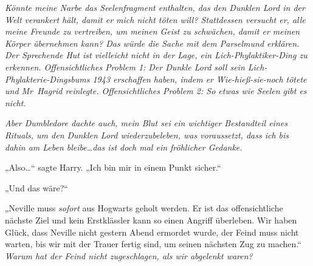 \emph{Könnte meine \emph{Narbe} das Seelenfragment enthalten, das den Dunklen Lord in der Welt verankert hält, damit er mich nicht töten will? Stattdessen versucht er, alle meine Freunde zu vertreiben, um meinen Geist zu schwächen, damit er meinen Körper übernehmen kann? Das würde die Sache mit dem Parselmund erklären. Der Sprechende Hut ist vielleicht nicht in der Lage, ein Lich-Phylaktiker-Ding zu erkennen. Offensichtliches Problem 1: Der Dunkle Lord soll sein Lich-Phylakterie-Dingsbums 1943 erschaffen haben, indem er Wie-hieß-sie-noch tötete und Mr~Hagrid reinlegte. Offensichtliches Problem 2: So etwas wie Seelen gibt es nicht.}

\emph{Aber Dumbledore dachte auch, mein Blut sei ein wichtiger Bestandteil eines Rituals, um den Dunklen Lord wiederzubeleben, was voraussetzt, dass ich bis dahin am Leben bleibe…das ist doch mal ein fröhlicher Gedanke.}

„Also…“ sagte Harry. „Ich bin mir in einem Punkt sicher.“

„Und das wäre?“

„Neville muss \emph{sofort} aus Hogwarts geholt werden. Er ist das offensichtliche nächste Ziel und kein Erstklässler kann so einen Angriff überleben. Wir haben Glück, dass Neville nicht gestern Abend ermordet wurde, der Feind muss nicht warten, bis wir mit der Trauer fertig sind, um seinen nächsten Zug zu machen.“
\emph{Warum hat der Feind nicht zugeschlagen, als wir abgelenkt waren?}

